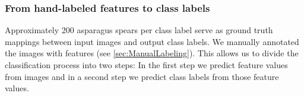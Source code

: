 \begin{table}[!htb]
	\centering
	\caption[Head Features CNN Performance]{\textbf{Performance of Head Features CNN}~~~Performance of the \acrshort{cnn} trained on asparagus heads.}
	\label{tab:performance_measures_head_based}
\end{table}


\subsubsection{From hand-labeled features to class labels}
\label{subsec:FeaturesToLabels}

Approximately 200 asparagus spears per class label serve as ground truth mappings between input images and output class labels. We manually annotated the images with features (see \autoref{sec:ManualLabeling}). This allows us to divide the classification process into two steps: In the first step we predict feature values from images and in a second step we predict class labels from those feature values.

